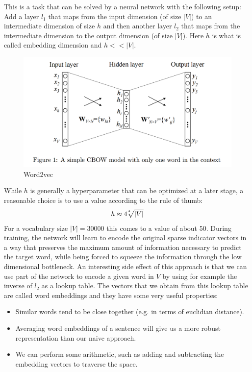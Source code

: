 This is a task that can be solved by a neural network with the following setup:
Add a layer $l_1$ that maps from the input dimension (of size $|V|$) to an intermediate dimension of size $h$ and then another layer $l_2$ that maps from the intermediate dimension to the output dimension (of size $|V|$).
Here $h$ is what is called embedding dimension and $h << |V|$.
\begin{figure}
  \includegraphics[width=\linewidth]{chapters/NLP/figures/word2vec.png}
  \caption{Word2vec}
  \label{fig:word2vec}
\end{figure}
While $h$ is generally a hyperparameter that can be optimized at a later stage, a reasonable choice is to use a value according to the rule of thumb:
\begin{equation}
  h \approx 4\sqrt[\leftroot{3} \uproot{3} 4]{|V|}
\end{equation}
For a vocabulary size $|V| = 30000$ this comes to a value of about $50$.
During training, the network will learn to encode the original sparse indicator vectors in a way that preserves the maximum amount of information necessary to predict the target word, while being forced to squeeze the information through the low dimensional bottleneck.
An interesting side effect of this approach is that we can use part of the network to encode a given word in $V$ by using for example the inverse of $l_2$ as a lookup table.
The vectors that we obtain from this lookup table are called word embeddings and they have some very useful properties:
\begin{itemize}
    \item Similar words tend to be close together (e.g. in terms of euclidian distance).
    \item Averaging word embeddings of a sentence will give us a more robust representation than our naive approach.
    \item We can perform some arithmetic, such as adding and subtracting the embedding vectors to traverse the space.
\end{itemize}
